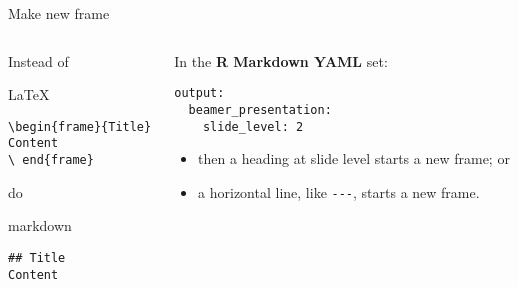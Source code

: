 \documentclass[10pt,aspectratio=169]{beamer}
\begin{document}
\begin{frame}[fragile]{Make new frame}

\begin{columns}[T]
\begin{column}{0.48\textwidth}
Instead of

\begin{block}{\LaTeX}

\begin{verbatim}
\begin{frame}{Title}
Content
\ end{frame}
\end{verbatim}

\end{block}

do

\begin{block}{markdown}

\begin{verbatim}
## Title
Content
\end{verbatim}

\end{block}
\end{column}

\begin{column}{0.48\textwidth}
In the \textbf{R Markdown YAML} set:

\begin{verbatim}
output:
  beamer_presentation:
    slide_level: 2
\end{verbatim}

\begin{itemize}
\item
  then a heading at slide level starts a new frame; or
\item
  a horizontal line, like \texttt{-\/-\/-}, starts a new frame.
\end{itemize}
\end{column}
\end{columns}

\end{frame}
\end{document}

